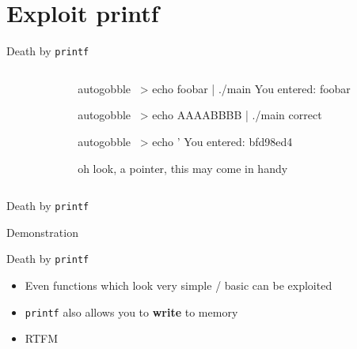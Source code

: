 \documentclass[beamer]{uibk}
\begin{document}
\section{Exploit printf}

\begin{frame}[fragile]{Death by \texttt{printf}}
    \begin{columns}
        \begin{column}{0.5\textwidth}
        \end{column}
        \begin{column}{0.5\textwidth}
            \pause
            \begin{pre*}{autogobble}
                ~> echo foobar | ./main
                You entered:
                foobar
            \end{pre*}
            \bigskip\pause
            \begin{pre*}{autogobble}
                ~> echo AAAABBBB | ./main
                correct
            \end{pre*}
            \bigskip\pause
            \begin{pre*} {autogobble}
                ~> echo '%
                You entered:
                bfd98ed4
            \end{pre*}
            \medskip
            oh look, a pointer, this may come in handy
        \end{column}
    \end{columns}
\end{frame}

\begin{frame}{Death by \texttt{printf}}
    \begin{center}
        \huge Demonstration
    \end{center}
\end{frame}

\begin{frame}{Death by \texttt{printf}}
    \begin{itemize}
        \item Even functions which look very simple / basic can be exploited
        \medskip
        \item \texttt{printf} also allows you to \textbf{write} to memory
        \medskip
        \item RTFM
    \end{itemize}
\end{frame}
\end{document}
